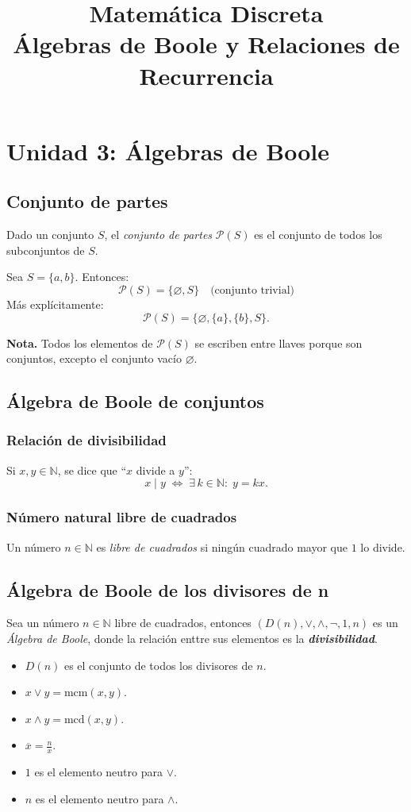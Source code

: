 \documentclass[11pt,a4paper]{article}   %
\date{}  %
\title{Matemática Discreta \\[0.5em]
\large Álgebras de Boole y Relaciones de Recurrencia}
\newcommand{\N}{\mathbb{N}}              %
\newcommand{\Pof}[1]{\mathcal{P}(#1)}    %
\begin{document}
\maketitle
\tableofcontents
\bigskip
\newpage

\section{Unidad 3: Álgebras de Boole}

\subsection{Conjunto de partes}
Dado un conjunto $S$, el \textit{conjunto de partes} $\Pof{S}$ es el conjunto de todos los subconjuntos de $S$.

Sea $S=\{a,b\}$. Entonces:
\[
\Pof{S}=\{\varnothing,S\}
\quad\text{(conjunto trivial)}
\]
Más explícitamente:
\[
\Pof{S}=\{\varnothing,\{a\},\{b\},S\}.
\]

\textbf{Nota.} Todos los elementos de $\Pof{S}$ se escriben entre llaves porque son conjuntos, excepto el conjunto vacío $\varnothing$.

\subsection{Álgebra de Boole de conjuntos}

\subsubsection{Relación de divisibilidad}
Si $x,y\in\N$, se dice que “$x$ divide a $y$”:
\[
x \mid y \;\Longleftrightarrow\; \exists\,k\in\N:\; y=kx.
\]

\subsubsection{Número natural libre de cuadrados}
Un número $n\in\N$ es \textit{libre de cuadrados} si ningún cuadrado mayor que $1$ lo divide.

\subsection{Álgebra de Boole de los divisores de n}
Sea un número $n\in\N$ libre de cuadrados, entonces $(D(n), \lor, \land, \lnot, 1, n)$ es un \textit{Álgebra de Boole},
donde la relación enttre sus elementos es la \textit{\textbf{divisibilidad}}.

\begin{itemize}
    \item $D(n)$ es el conjunto de todos los divisores de $n$.
    \item $x \lor y = \text{mcm}(x,y)$.
    \item $x \land y = \text{mcd}(x,y)$.
    \item $\overline x = \frac{n}{x}$.
    \item $1$ es el elemento neutro para $\lor$.
    \item $n$ es el elemento neutro para $\land$.
\end{itemize}
\end{document}
